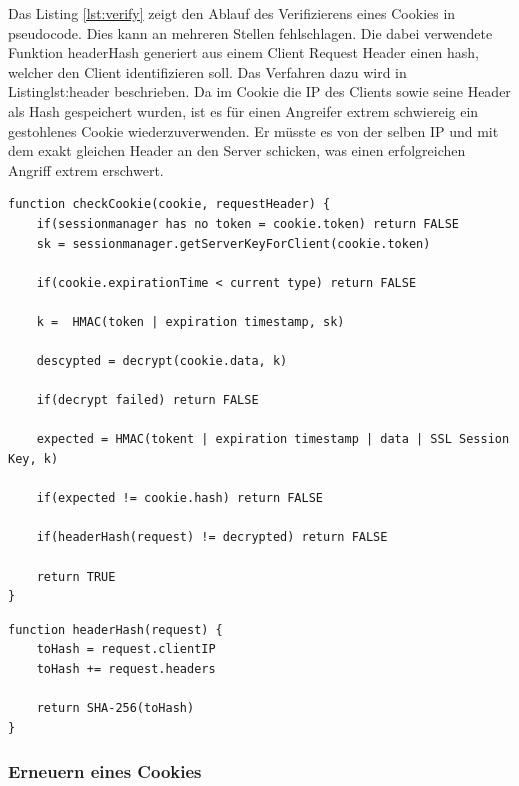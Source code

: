 Das Listing \ref{lst:verify} zeigt den Ablauf des Verifizierens eines Cookies in pseudocode. 
Dies kann an mehreren Stellen fehlschlagen. Die dabei verwendete Funktion headerHash generiert 
aus einem Client Request Header einen hash, welcher den Client identifizieren soll. Das Verfahren
dazu wird in Listing{lst:header} beschrieben. Da im Cookie die IP des Clients sowie seine Header
als Hash gespeichert wurden, ist es für einen Angreifer extrem schwiereig ein gestohlenes Cookie
wiederzuverwenden. Er müsste es von der selben IP und mit dem exakt gleichen Header an den Server
schicken, was einen erfolgreichen Angriff extrem erschwert.
\newline
\begin{lstlisting}[caption=Verifikation eines Cookies,label={lst:verify}]
function checkCookie(cookie, requestHeader) {
    if(sessionmanager has no token = cookie.token) return FALSE
    sk = sessionmanager.getServerKeyForClient(cookie.token)

    if(cookie.expirationTime < current type) return FALSE

    k =  HMAC(token | expiration timestamp, sk)

    descypted = decrypt(cookie.data, k)

    if(decrypt failed) return FALSE

    expected = HMAC(tokent | expiration timestamp | data | SSL Session Key, k)

    if(expected != cookie.hash) return FALSE

    if(headerHash(request) != decrypted) return FALSE

    return TRUE
}
\end{lstlisting}
\newpage
\begin{lstlisting}[caption=Hashen des Headers eines Client Requests,label={lst:verify}]
function headerHash(request) {
    toHash = request.clientIP
    toHash += request.headers

    return SHA-256(toHash) 
}
\end{lstlisting}

\subsubsection{Erneuern eines Cookies}

